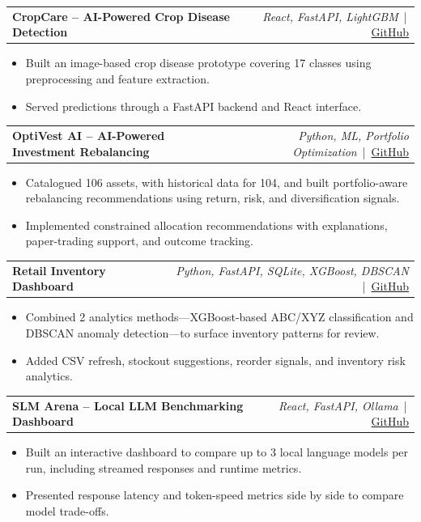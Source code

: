 \documentclass[a4paper,10pt]{article}
\begin{document}
\begin{tabularx}{\linewidth}{@{}Xr@{}}\textbf{CropCare -- AI-Powered Crop Disease Detection} & \textit{React, FastAPI, LightGBM} \,|\, \href{https://github.com/naitik24-code/Crop-Care-Detection}{GitHub}\end{tabularx}
\begin{itemize}\item Built an image-based crop disease prototype covering 17 classes using preprocessing and feature extraction.\item Served predictions through a FastAPI backend and React interface.\end{itemize}

\begin{tabularx}{\linewidth}{@{}Xr@{}}\textbf{OptiVest AI -- AI-Powered Investment Rebalancing} & \textit{Python, ML, Portfolio Optimization} \,|\, \href{https://github.com/naitik24-code/OptiVest1}{GitHub}\end{tabularx}
\begin{itemize}
\item Catalogued 106 assets, with historical data for 104, and built portfolio-aware rebalancing recommendations using return, risk, and diversification signals.
\item Implemented constrained allocation recommendations with explanations, paper-trading support, and outcome tracking.
\end{itemize}

\begin{tabularx}{\linewidth}{@{}Xr@{}}\textbf{Retail Inventory Dashboard} & \textit{Python, FastAPI, SQLite, XGBoost, DBSCAN} \,|\, \href{https://github.com/naitik24-code/retail-inventory-dashboard}{GitHub}\end{tabularx}
\begin{itemize}\item Combined 2 analytics methods—XGBoost-based ABC/XYZ classification and DBSCAN anomaly detection—to surface inventory patterns for review.\item Added CSV refresh, stockout suggestions, reorder signals, and inventory risk analytics.\end{itemize}

\begin{tabularx}{\linewidth}{@{}Xr@{}}\textbf{SLM Arena -- Local LLM Benchmarking Dashboard} & \textit{React, FastAPI, Ollama} \,|\, \href{https://github.com/naitik24-code/Slm-Arena}{GitHub}\end{tabularx}
\begin{itemize}
\item Built an interactive dashboard to compare up to 3 local language models per run, including streamed responses and runtime metrics.
\item Presented response latency and token-speed metrics side by side to compare model trade-offs.
\end{itemize}
\end{document}
